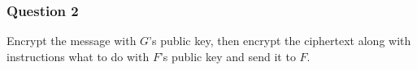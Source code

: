 \documentclass{article}
\numberwithin{defn}{section}
\numberwithin{equation}{section}
\begin{document}
	\subsubsection*{Question 2}
	Encrypt the message with $G$'s public key, then encrypt the ciphertext along with instructions what to do with $F$'s public key and send it to $F$.
	


\end{document}
